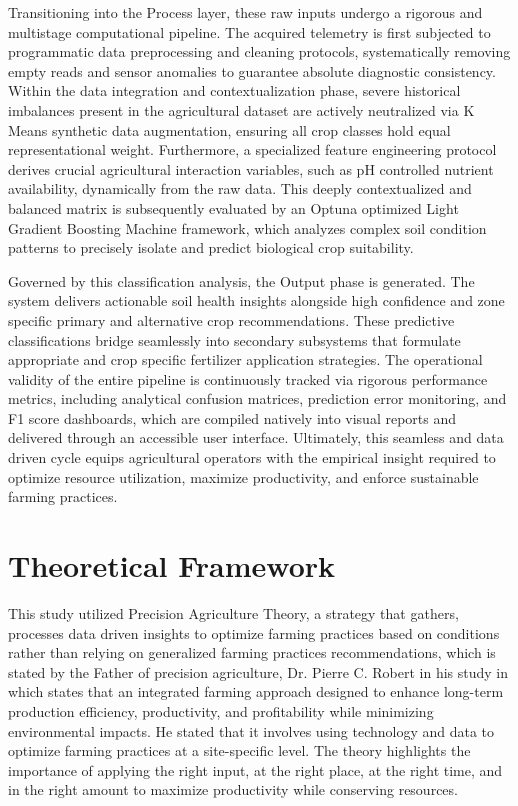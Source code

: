{	Transitioning into the Process layer, these raw inputs undergo a rigorous and multistage computational pipeline. The acquired telemetry is first subjected to programmatic data preprocessing and cleaning protocols, systematically removing empty reads and sensor anomalies to guarantee absolute diagnostic consistency. Within the data integration and contextualization phase, severe historical imbalances present in the agricultural dataset are actively neutralized via K Means synthetic data augmentation, ensuring all crop classes hold equal representational weight. Furthermore, a specialized feature engineering protocol derives crucial agricultural interaction variables, such as pH controlled nutrient availability, dynamically from the raw data. This deeply contextualized and balanced matrix is subsequently evaluated by an Optuna optimized Light Gradient Boosting Machine framework, which analyzes complex soil condition patterns to precisely isolate and predict biological crop suitability.
	
	Governed by this classification analysis, the Output phase is generated. The system delivers actionable soil health insights alongside high confidence and zone specific primary and alternative crop recommendations. These predictive classifications bridge seamlessly into secondary subsystems that formulate appropriate and crop specific fertilizer application strategies. The operational validity of the entire pipeline is continuously tracked via rigorous performance metrics, including analytical confusion matrices, prediction error monitoring, and F1 score dashboards, which are compiled natively into visual reports and delivered through an accessible user interface. Ultimately, this seamless and data driven cycle equips agricultural operators with the empirical insight required to optimize resource utilization, maximize productivity, and enforce sustainable farming practices.
	
	\section{Theoretical Framework}
	
	This study utilized Precision Agriculture Theory, a strategy that gathers, processes data driven insights to optimize farming practices based on conditions rather than relying on generalized farming practices recommendations, which is stated by the Father of precision agriculture, Dr. Pierre C. Robert in his study in  \cite{RobertTribute} which states that an integrated farming approach designed to enhance long-term production efficiency, productivity, and profitability while minimizing environmental impacts. He stated that it involves using technology and data to optimize farming practices at a site-specific level. The theory highlights the importance of applying the right input, at the right place, at the right time, and in the right amount to maximize productivity while conserving resources.
	
}
